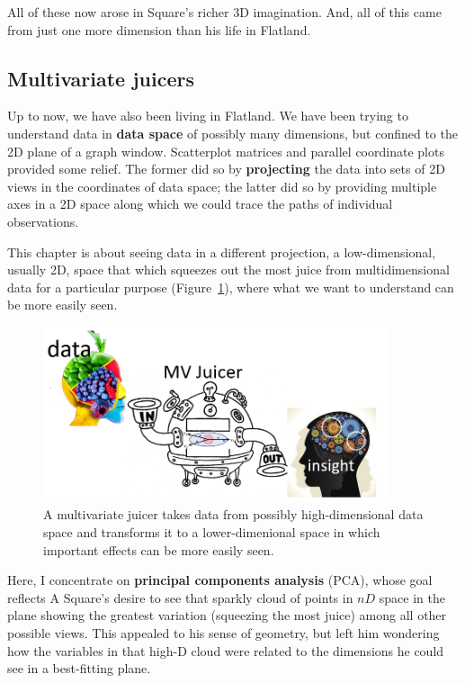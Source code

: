 \documentclass[
  letterpaper,
  10pt,
  krantz2]{krantz}
\begin{document}
All of these now arose in Square's richer 3D imagination. And, all of
this came from just one more dimension than his life in Flatland.

\hypertarget{multivariate-juicers}{%
\subsection{Multivariate juicers}\label{multivariate-juicers}}

Up to now, we have also been living in Flatland. We have been trying to
understand data in \textbf{data space} of possibly many dimensions, but
confined to the 2D plane of a graph window. Scatterplot matrices and
parallel coordinate plots provided some relief. The former did so by
\textbf{projecting} the data into sets of 2D views in the coordinates of
data space; the latter did so by providing multiple axes in a 2D space
along which we could trace the paths of individual observations.

This chapter is about seeing data in a different projection, a
low-dimensional, usually 2D, space that which squeezes out the most
juice from multidimensional data for a particular purpose
(Figure~\ref{fig-MV-juicer}), where what we want to understand can be
more easily seen.

\begin{figure}

{\centering \includegraphics[width=0.9\textwidth,height=\textheight]{images/MV-juicer.png}

}

\caption{\label{fig-MV-juicer}A multivariate juicer takes data from
possibly high-dimensional data space and transforms it to a
lower-dimenional space in which important effects can be more easily
seen.}

\end{figure}

Here, I concentrate on \textbf{principal components analysis} (PCA),
whose goal reflects A Square's desire to see that sparkly cloud of
points in \(nD\) space in the plane showing the greatest variation
(squeezing the most juice) among all other possible views. This appealed
to his sense of geometry, but left him wondering how the variables in
that high-D cloud were related to the dimensions he could see in a
best-fitting plane.
\end{document}
